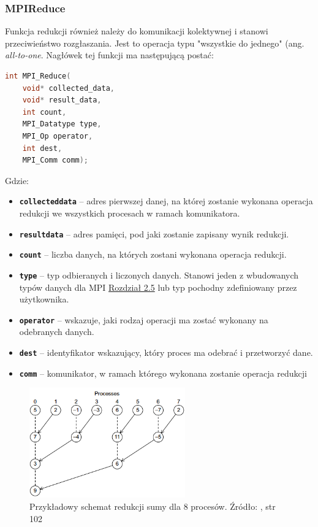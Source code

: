 \subsubsection{MPI\textunderscore Reduce}

Funkcja redukcji również należy do komunikacji kolektywnej i stanowi przeciwieństwo rozgłaszania. Jest to operacja typu "wszystkie do jednego" (ang. \textit{all-to-one}. Nagłówek tej funkcji ma następującą postać:

\begin{lstlisting}[language=C]
int MPI_Reduce(
	void* collected_data,
	void* result_data,
	int count,
	MPI_Datatype type,
	MPI_Op operator,
	int dest,
	MPI_Comm comm);
\end{lstlisting}

Gdzie:

\begin{itemize}
	\item \texttt{\textbf{collected\textunderscore data}} -- adres pierwszej danej, na której zostanie wykonana operacja redukcji we wszystkich procesach w ramach komunikatora.
	\item \texttt{\textbf{result\textunderscore data}} -- adres pamięci, pod jaki zostanie zapisany wynik redukcji.
	\item \texttt{\textbf{count}} -- liczba danych, na których zostani wykonana operacja redukcji.
	\item \texttt{\textbf{type}} --  typ odbieranych i liczonych danych. Stanowi jeden z wbudowanych typów danych dla MPI \hyperref[table:datatypes]{Rozdział 2.5} lub typ pochodny zdefiniowany przez użytkownika.
	\item \texttt{\textbf{operator}} -- wskazuje, jaki rodzaj operacji ma zostać wykonany na odebranych danych.
	\item \texttt{\textbf{dest}} -- identyfikator wskazujący, który proces ma odebrać i przetworzyć dane.
	\item \texttt{\textbf{comm}} -- komunikator, w ramach którego wykonana zostanie operacja redukcji
\end{itemize}

\begin{figure}[h]
	\centering
	\includegraphics[width=0.6\textwidth]{./img/redukcja.png}
	\caption{Przykładowy schemat redukcji sumy dla 8 procesów. Źródło: \cite{Pacheco}, str 102}
	\label{img:sieć}
\end{figure}

